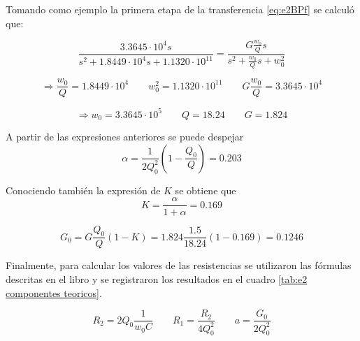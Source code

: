 Tomando como ejemplo la primera etapa de la transferencia \eqref{eq:e2BPf} se calculó que:

\begin{equation}
\frac{3.3645\cdot 10^4s}{s^2 + 1.8449\cdot10^4 s + 1.1320\cdot10^{11}} = \frac{ G \frac{w_0}{Q}s }{s^2+ \frac{w_0}{Q}s+w_0^2}
\end{equation}

\begin{equation*}
\Rightarrow \frac{w_0}{Q}= 1.8449\cdot10^4	\qquad w_0^2=1.1320\cdot10^{11} \qquad	G \frac{w_0}{Q}=3.3645\cdot 10^4
\end{equation*}

\begin{equation}
\Rightarrow w_0=3.3645\cdot10^5 \qquad	Q=18.24 \qquad	G=1.824
\end{equation}

A partir de las expresiones anteriores se puede despejar
\begin{equation*}
\alpha=\frac{1}{2Q_0^2}\left(1-\frac{Q_0}{Q}\right) = 0.203
\end{equation*}

Conociendo también la expresión de $K$ se obtiene que
\begin{equation*}
K=\frac{\alpha}{1+\alpha} = 0.169
\end{equation*}

\begin{equation*}
G_0=G\frac{Q_0}{Q}(1-K) = 1.824\frac{1.5}{18.24}(1-0.169)=0.1246
\end{equation*}

Finalmente, para calcular los valores de las resistencias se utilizaron las fórmulas descritas en el libro y se registraron los resultados en el cuadro \ref{tab:e2 componentes teoricos}.

\begin{equation}
R_2=2Q_0\frac{1}{w_0C} \qquad R_1=\frac{R_2}{4Q_0^2} \qquad a=\frac{G_0}{2Q_0^2}
\end{equation}

